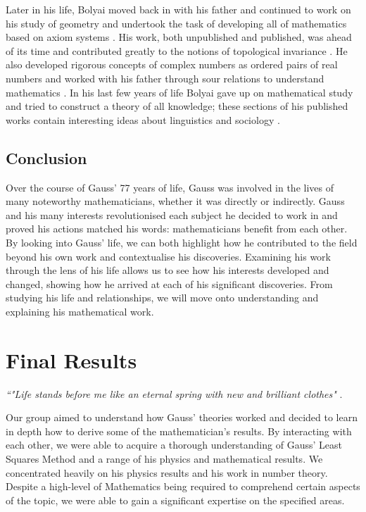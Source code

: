 \documentclass{article}
\begin{document}
Later in his life, Bolyai moved back in with his father and continued to work on his study of geometry and undertook the task of developing all of mathematics based on axiom systems \cite{standrewsbolyai}. His work, both unpublished and published, was ahead of its time and contributed greatly to the notions of topological invariance \cite{standrewsbolyai}. He also developed rigorous concepts of complex numbers as ordered pairs of real numbers and worked with his father through sour relations to understand mathematics \cite{standrewsbolyai}. In his last few years of life Bolyai gave up on mathematical study and tried to construct a theory of all knowledge; these sections of his published works contain interesting ideas about linguistics and sociology \cite{standrewsbolyai}. 

\subsection{Conclusion}
Over the course of Gauss’ 77 years of life, Gauss was involved in the lives of many noteworthy mathematicians, whether it was directly or indirectly. Gauss and his many interests revolutionised each subject he decided to work in and proved his actions matched his words: mathematicians benefit from each other. By looking into Gauss’ life, we can both highlight how he contributed to the field beyond his own work and contextualise his discoveries. Examining his work through the lens of his life allows us to see how his interests developed and changed, showing how he arrived at each of his significant discoveries. From studying his life and relationships, we will move onto understanding and explaining his mathematical work. 


\section{Final Results}

\begin{center}
    \textit{``"Life stands before me like an eternal spring with new and brilliant clothes"}
    .
\end{center}

Our group aimed to understand how Gauss’ theories worked and decided to learn in depth how to derive some of the mathematician’s results. By interacting with each other, we were able to acquire a thorough understanding of Gauss’ Least Squares Method and a range of his physics and mathematical results. We concentrated heavily on his physics results and his work in number theory. Despite a high-level of Mathematics being required to comprehend certain aspects of the topic, we were able to gain a significant expertise on the specified areas.
\end{document}
